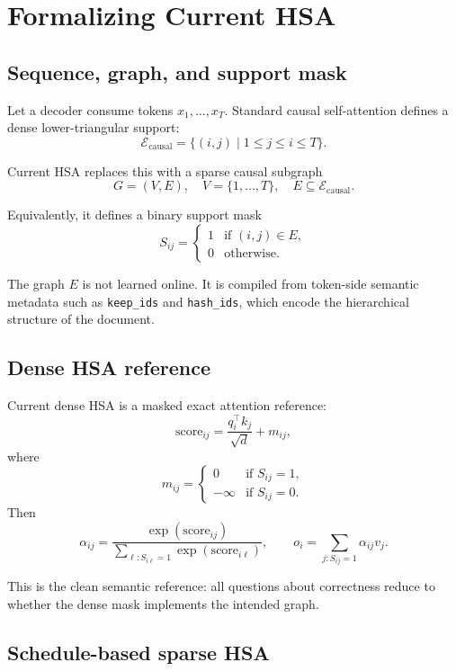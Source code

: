 \documentclass[11pt]{article}
\begin{document}
\section{Formalizing Current HSA}

\subsection{Sequence, graph, and support mask}

Let a decoder consume tokens $x_1, \dots, x_T$. Standard causal self-attention
defines a dense lower-triangular support:
\[
\mathcal{E}_{\mathrm{causal}} = \{(i,j) \mid 1 \le j \le i \le T\}.
\]

Current HSA replaces this with a sparse causal subgraph
\[
G = (V, E), \quad V = \{1, \dots, T\}, \quad E \subseteq \mathcal{E}_{\mathrm{causal}}.
\]

Equivalently, it defines a binary support mask
\[
S_{ij} =
\begin{cases}
1 & \text{if } (i,j) \in E,\\
0 & \text{otherwise.}
\end{cases}
\]

The graph $E$ is not learned online. It is compiled from token-side semantic
metadata such as \texttt{keep\_ids} and \texttt{hash\_ids}, which encode the
hierarchical structure of the document.

\subsection{Dense HSA reference}

Current dense HSA is a masked exact attention reference:
\[
\mathrm{score}_{ij} = \frac{q_i^\top k_j}{\sqrt{d}} + m_{ij},
\]
where
\[
m_{ij} =
\begin{cases}
0 & \text{if } S_{ij}=1,\\
-\infty & \text{if } S_{ij}=0.
\end{cases}
\]
Then
\[
\alpha_{ij} = \frac{\exp(\mathrm{score}_{ij})}
{\sum_{\ell : S_{i\ell}=1}\exp(\mathrm{score}_{i\ell})},
\qquad
o_i = \sum_{j : S_{ij}=1} \alpha_{ij} v_j.
\]

This is the clean semantic reference: all questions about correctness reduce to
whether the dense mask implements the intended graph.

\subsection{Schedule-based sparse HSA}
\end{document}

